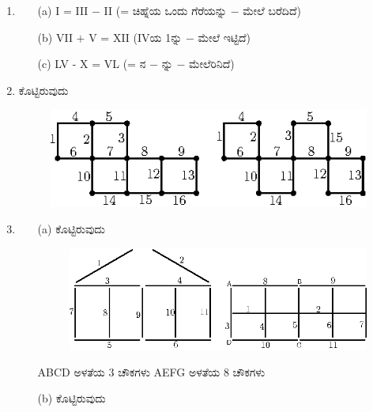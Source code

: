 \begin{enumerate}
\vskip 0.3cm

\item 
\begin{itemize}
\item[(a)] I = III $-$ II (= ಚಿಹ್ನೆಯ ಒಂದು ಗೆರೆಯನ್ನು $-$ ಮೇಲೆ ಬರೆದಿದೆ)
\item[(b)] VII $+$ V = XII (IVಯ 1ನ್ನು $-$ ಮೇಲೆ ಇಟ್ಟಿದೆ)
\item[(c)] LV - X = VL (= ನ $-$ ನ್ನು $-$ ಮೇಲೆರಿನಿದೆ)
\end{itemize}

\eject

\item ಕೊಟ್ಟಿರುವುದು
\begin{figure}[H]
\centering
\includegraphics{images/chap9/ans10.eps}

\hspace{4cm}
\end{figure}

\item 

\begin{itemize}
\item[(a)] ಕೊಟ್ಟಿರುವುದು
\begin{figure}[H]
\centering
\hspace{4cm}

\includegraphics[scale=0.9]{images/chap9/ans11a.eps}
\end{figure}

\vskip -0.1cm

ABCD ಅಳತೆಯ 3 ಚೌಕಗಳು AEFG ಅಳತೆಯ 8 ಚೌಕಗಳು 

\item[(b)] ಕೊಟ್ಟಿರುವುದು
\begin{figure}[H]
\centering
\hspace{4cm}


\end{figure}
\end{itemize}
\end{enumerate}
